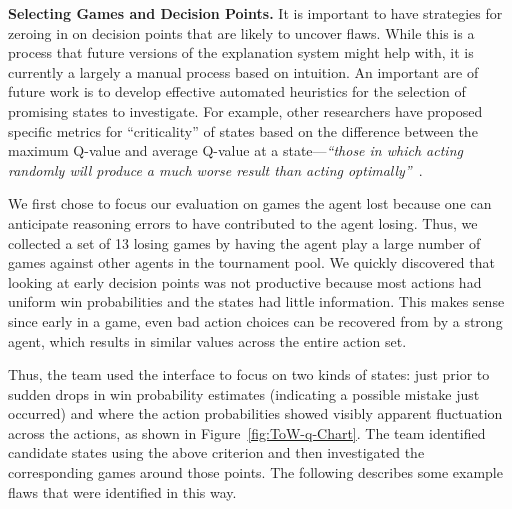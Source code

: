 \documentclass{article}
\begin{document}


{\bf Selecting Games and Decision Points.}
\label{analysisSelection}
It is important to have strategies for zeroing in on decision points that are likely to uncover flaws. While this is a process that future versions of the explanation system might help with, it is currently a largely a manual process based on intuition. 
An important are of future work is to develop effective automated heuristics for the selection of promising states to investigate. For example, other researchers have proposed specific metrics for ``criticality'' of states based on the difference between the maximum Q-value and average Q-value at a state---\emph{``those in which acting randomly will produce a much worse result than acting optimally''}~\cite{Huang2018}.

We first chose to focus our evaluation on games the agent lost because one can anticipate reasoning errors to have contributed to the agent losing.
Thus, we collected a set of 13 losing games by having the agent play a large number of games against other agents in the tournament pool.
We quickly discovered that looking at early decision points was not productive because most actions had uniform win probabilities and the states had little information. This makes sense since early in a game, even bad action choices can be recovered from by a strong agent, which results in similar values across the entire action set. 

Thus, the team used the interface to focus on two kinds of states: just prior to sudden drops in win probability estimates (indicating a possible mistake just occurred) and where the action probabilities showed visibly apparent fluctuation across the actions, as shown in Figure~\ref{fig:ToW-q-Chart}.
The team identified candidate states using the above criterion and then investigated the corresponding games around those points. The following describes some example flaws that were identified in this way. 
\end{document}
